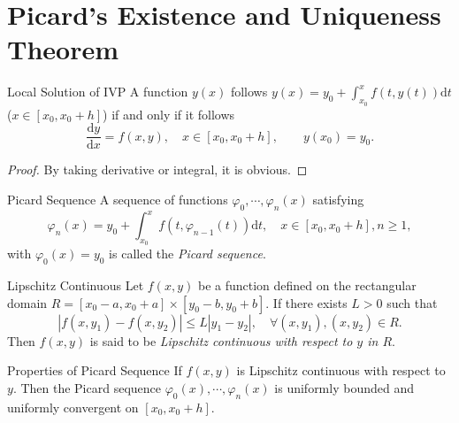 
\section{Picard's Existence and Uniqueness Theorem}


\begin{lemma}{Local Solution of IVP}{}
  A function $y(x)$ follows
  $y(x) = y_0 + \int_{x_0}^xf(t,y(t))\mathrm{d} t$ ($x \in [x_0, x_0 + h]$)
  if and only if it follows
  \begin{equation}
    \frac{\mathrm{d} y}{\mathrm{d} x} = f(x,y), \quad x \in [x_0, x_0 + h],
    \quad \quad y(x_0) = y_0.
  \end{equation}
\end{lemma}

\begin{proof}
  By taking derivative or integral, it is obvious.
\end{proof}

\begin{definition}{Picard Sequence}{}
  A sequence of functions $\varphi_0,\cdots,\varphi_n(x)$ satisfying
  \begin{equation}
    \varphi_n(x) = y_0 + \int_{x_0}^x f(t, \varphi_{n-1}(t))\mathrm{d} t, \quad
    x \in [x_0, x_0 + h], n \geq 1,
  \end{equation}
  with $\varphi_0(x) = y_0$ is called the \emph{Picard sequence}.
\end{definition}

\begin{definition}{Lipschitz Continuous}{}
  Let $f(x,y)$ be a function defined on
  the rectangular domain $R = [x_0-a,x_0+a] \times [y_0-b, y_0 + b]$.
  If there exists $L > 0$ such that
  \begin{equation}
    \left| f(x,y_1) - f(x,y_2)  \right| \leq L |y_1 - y_2|, \quad
    \forall (x, y_1), (x, y_2) \in R.
  \end{equation}
  Then $f(x,y)$ is said to be \emph{Lipschitz continuous with respect to $y$ in $R$}.
\end{definition}

\begin{lemma}{Properties of Picard Sequence}{}
  If $f(x,y)$ is Lipschitz continuous with respect to $y$.
  Then the Picard sequence $\varphi_0(x),\cdots,\varphi_n(x)$ is
  uniformly bounded and uniformly convergent on $[x_0, x_0 + h]$.
\end{lemma}

